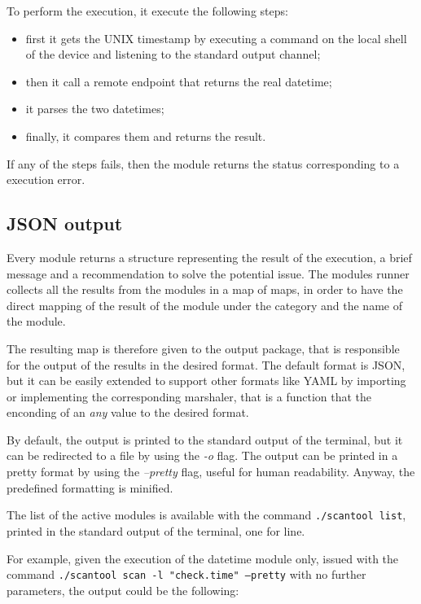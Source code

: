 To perform the execution, it execute the following steps:
\begin{itemize}
  \item first it gets the UNIX timestamp by executing a command on the local shell of the device and listening to the standard output channel;
  \item then it call a remote endpoint that returns the real datetime;
  \item it parses the two datetimes;
  \item finally, it compares them and returns the result.
\end{itemize}

If any of the steps fails, then the module returns the status corresponding to a execution error.


\subsection{JSON output}

Every module returns a structure representing the result of the execution, a brief message and a recommendation to solve the potential issue. The modules runner collects all the results from the modules in a map of maps, in order to have the direct mapping of the result of the module under the category and the name of the module.

The resulting map is therefore given to the output package, that is responsible for the output of the results in the desired format. The default format is JSON, but it can be easily extended to support other formats like YAML by importing or implementing the corresponding marshaler, that is a function that the enconding of an \textit{any} value to the desired format.

By default, the output is printed to the standard output of the terminal, but it can be redirected to a file by using the \textit{-o} flag. The output can be printed in a pretty format by using the \textit{--pretty} flag, useful for human readability. Anyway, the predefined formatting is minified.

The list of the active modules is available with the command \texttt{./scantool list}, printed in the standard output of the terminal, one for line.

For example, given the execution of the datetime module only, issued with the command \texttt{./scantool scan -l "check.time" --pretty} with no further parameters, the output could be the following:

